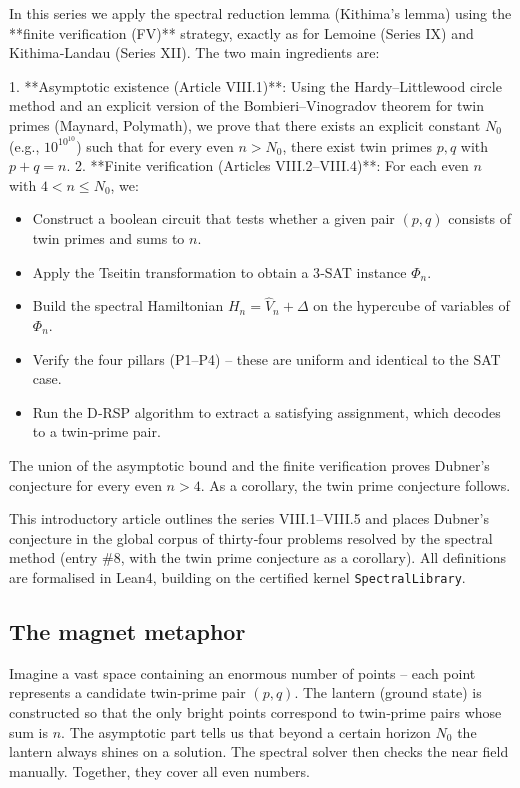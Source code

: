 \documentclass[11pt,a4paper]{article}
\begin{document}
In this series we apply the spectral reduction lemma (Kithima's lemma) using the **finite verification (FV)** strategy, exactly as for Lemoine (Series IX) and Kithima‑Landau (Series XII). The two main ingredients are:

1. **Asymptotic existence (Article VIII.1)**: Using the Hardy–Littlewood circle method and an explicit version of the Bombieri–Vinogradov theorem for twin primes (Maynard, Polymath), we prove that there exists an explicit constant \(N_0\) (e.g., \(10^{10^{10}}\)) such that for every even \(n > N_0\), there exist twin primes \(p,q\) with \(p+q = n\).
2. **Finite verification (Articles VIII.2–VIII.4)**: For each even \(n\) with \(4 < n \le N_0\), we:
   \begin{itemize}
   \item Construct a boolean circuit that tests whether a given pair \((p,q)\) consists of twin primes and sums to \(n\).
   \item Apply the Tseitin transformation to obtain a 3‑SAT instance \(\Phi_n\).
   \item Build the spectral Hamiltonian \(H_n = \hat{V}_n + \Delta\) on the hypercube of variables of \(\Phi_n\).
   \item Verify the four pillars (P1–P4) – these are uniform and identical to the SAT case.
   \item Run the D‑RSP algorithm to extract a satisfying assignment, which decodes to a twin‑prime pair.
   \end{itemize}

The union of the asymptotic bound and the finite verification proves Dubner's conjecture for every even \(n > 4\). As a corollary, the twin prime conjecture follows.

This introductory article outlines the series VIII.1–VIII.5 and places Dubner's conjecture in the global corpus of thirty‑four problems resolved by the spectral method (entry \#8, with the twin prime conjecture as a corollary). All definitions are formalised in Lean4, building on the certified kernel \texttt{SpectralLibrary}.

\subsection{The magnet metaphor}

Imagine a vast space containing an enormous number of points – each point represents a candidate twin‑prime pair \((p,q)\). The lantern (ground state) is constructed so that the only bright points correspond to twin‑prime pairs whose sum is \(n\). The asymptotic part tells us that beyond a certain horizon \(N_0\) the lantern always shines on a solution. The spectral solver then checks the near field manually. Together, they cover all even numbers.
\end{document}
